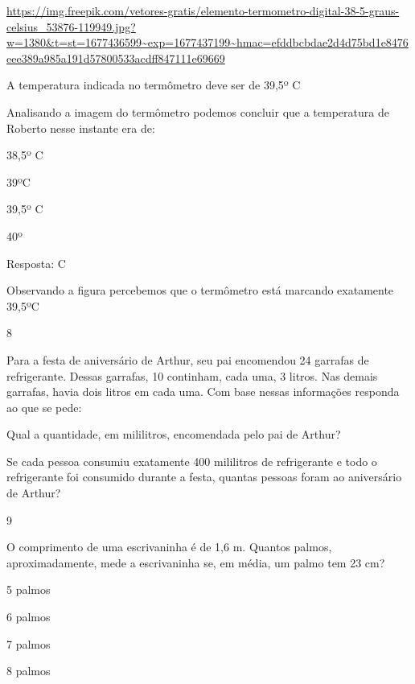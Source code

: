 \begin{escolha}
\url{https://img.freepik.com/vetores-gratis/elemento-termometro-digital-38-5-graus-celsius_53876-119949.jpg?w=1380\&t=st=1677436599~exp=1677437199~hmac=efddbcbdae2d4d75bd1e8476eee389a985a191d57800533acdff847111e69669}

A temperatura indicada no termômetro deve ser de 39,5º C

Analisando a imagem do termômetro podemos concluir que a temperatura de
Roberto nesse instante era de:

\begin{escolha}

\item
  38,5º C
\item
  39ºC
\item
  39,5º C
\item
  40º
\end{escolha}

Resposta: C

Observando a figura percebemos que o termômetro está marcando exatamente
39,5ºC

\num{8}

Para a festa de aniversário de Arthur, seu pai encomendou 24 garrafas de
refrigerante. Dessas garrafas, 10 continham, cada uma, 3 litros. Nas
demais garrafas, havia dois litros em cada uma. Com base nessas
informações responda ao que se pede:

\begin{escolha}

\item
  Qual a quantidade, em mililitros, encomendada pelo pai de Arthur?

\item
  Se cada pessoa consumiu exatamente 400 mililitros de refrigerante e
  todo o refrigerante foi consumido durante a festa, quantas pessoas
  foram ao aniversário de Arthur?

\end{escolha}

\num{9}

O comprimento de uma escrivaninha é de 1,6 m. Quantos palmos,
aproximadamente, mede a escrivaninha se, em média, um palmo tem 23 cm?

\begin{escolha}

\item
  5 palmos
\item
  6 palmos
\item
  7 palmos
\item
  8 palmos
\end{escolha}


\end{escolha}
